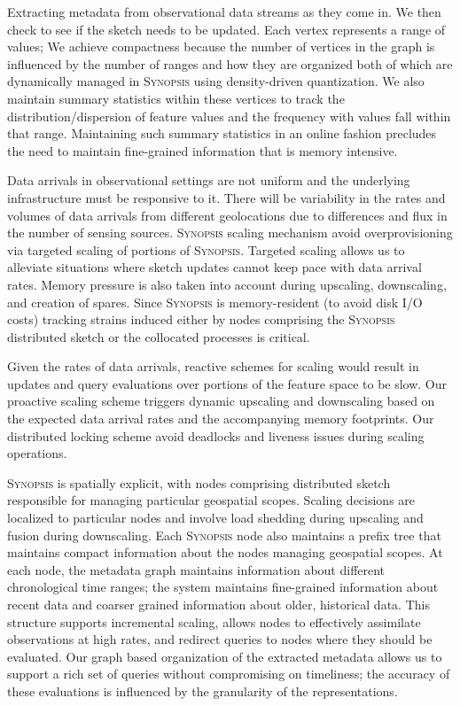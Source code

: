 \begin{description}[leftmargin=*]
\item[RQ-1:] Extracting metadata from observational data streams as they come in. We then check to see if the sketch needs to be updated. Each vertex represents a range of values; 
We achieve compactness because the number of vertices in the graph is influenced by the number of ranges and how they are organized both of which are dynamically managed in \textsc{Synopsis} using density-driven quantization.  We also maintain summary statistics within these vertices to track the distribution/dispersion of feature values and the frequency with values fall within that range. Maintaining such summary statistics in an online fashion precludes the need to maintain fine-grained information that is memory intensive.

\item[RQ-2:] Data arrivals in observational settings are not uniform and the underlying infrastructure must be responsive to it.  There will be variability in the rates and volumes of data arrivals from different geolocations due to differences and flux in the number of sensing sources. \textsc{Synopsis} scaling mechanism avoid overprovisioning via targeted scaling of portions of \textsc{Synopsis}. 
Targeted scaling allows us to alleviate situations where sketch updates cannot keep pace with data arrival rates.  Memory pressure is also taken into account during upscaling, downscaling, and creation of spares. Since \textsc{Synopsis} is memory-resident (to avoid disk I/O costs) tracking strains induced either by nodes comprising the \textsc{Synopsis} distributed sketch or the collocated processes is critical.

Given the rates of data arrivals, reactive schemes for scaling would result in updates and query evaluations over portions of the feature space to be slow. Our proactive scaling scheme triggers dynamic upscaling and downscaling based on the expected data arrival rates and the accompanying memory footprints. Our distributed locking scheme avoid deadlocks and liveness issues during scaling operations.

\item[RQ-3:] \textsc{Synopsis} is spatially explicit, with nodes comprising distributed sketch responsible for managing particular geospatial scopes. Scaling decisions are localized to particular nodes and involve load shedding during upscaling and fusion during downscaling. Each \textsc{Synopsis} node also maintains a prefix tree that maintains compact information about the nodes managing geospatial scopes. At each node, the metadata graph maintains information about different chronological time ranges; the system maintains fine-grained information about recent data and coarser grained information about older, historical data. This structure supports incremental scaling, allows nodes to effectively assimilate observations at high rates, and redirect queries to nodes where they should be evaluated. Our graph based organization of the extracted metadata allows us to support a rich set of queries without compromising on timeliness; the accuracy of these evaluations is influenced by the granularity of the representations.  


\end{description}
